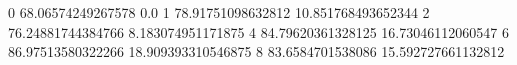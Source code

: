 0 68.06574249267578 0.0
1 78.91751098632812 10.851768493652344
2 76.24881744384766 8.183074951171875
4 84.79620361328125 16.73046112060547
6 86.97513580322266 18.909393310546875
8 83.6584701538086 15.592727661132812
